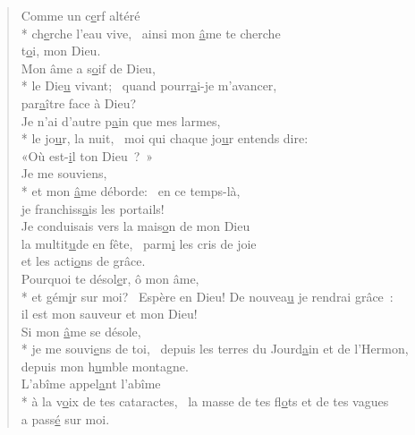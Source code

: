 \begin{verse}

Comme un c\underline{e}rf altéré \\*
ch\underline{e}rche l’eau vive,~\psalmstar
ainsi mon \underline{â}me te cherche \\
t\underline{o}i, mon Dieu. \\

Mon âme a s\underline{o}if de Dieu, \\*
le Die\underline{u} vivant;~\psalmstar
quand pourr\underline{a}i-je m’avancer, \\
par\underline{a}ître face à Dieu? \\

Je n’ai d’autre p\underline{a}in que mes larmes, \\*
le jo\underline{u}r, la nuit,~\psalmstar
moi qui chaque jo\underline{u}r entends dire: \\
«Où est-\underline{i}l ton Dieu ? » \\

Je me souviens, \\*
et mon \underline{â}me déborde:~\psalmstar
en ce temps-là, \\
je franchiss\underline{a}is les portails! \\

Je conduisais vers la mais\underline{o}n de mon Dieu \\
la multit\underline{u}de en fête,~\psalmstar
parm\underline{i} les cris de joie \\
et les acti\underline{o}ns de grâce. \\

Pourquoi te désol\underline{e}r, ô mon âme, \\*
et gém\underline{i}r sur moi?~\psalmstar
Espère en Dieu! De nouvea\underline{u} je rendrai grâce : \\
il est mon sauveur et mon Dieu! \\

Si mon \underline{â}me se désole, \\*
je me souvi\underline{e}ns de toi,~\psalmstar
depuis les terres du Jourd\underline{a}in et de l’Hermon, \\
depuis mon h\underline{u}mble montagne. \\

L’abîme appel\underline{a}nt l’abîme \\*
à la v\underline{o}ix de tes cataractes,~\psalmstar
la masse de tes fl\underline{o}ts et de tes vagues \\
a pass\underline{é} sur moi. \\


\end{verse}
